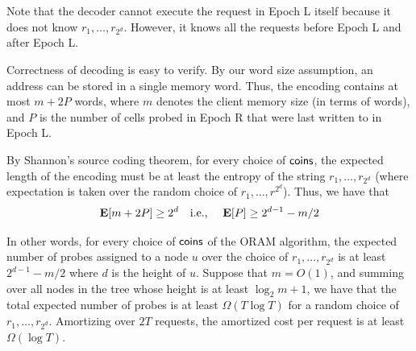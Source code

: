 Note that the decoder cannot execute the request in Epoch L
itself because it does not know $r_1, \ldots, r_{2^d}$.
However, it knows all the requests before Epoch L and after Epoch L. 


Correctness of decoding is easy to verify. 
By our word size
 assumption, an address can be stored in a single memory word.
Thus, the encoding contains at most  
$m + 2 P$
words, where 
$m$
denotes the client memory size (in terms of words), and 
$P$ is the number 
of cells probed in Epoch R that were 
last written to in Epoch L.

By Shannon's source coding theorem, for every choice
of ${\sf coins}$, the expected length of the encoding 
must be at least the entropy
of the string $r_1, \ldots, r_{2^d}$ (where expectation
is taken over the random choice of $r_1, \ldots, r^{2^d}$). 
Thus, we have that 
\[
{\bf E}[m + 2 P] \geq 2^d \quad \text{i.e., }
\quad {\bf E}[P] \geq 2^{d-1}-m/2
\]

In other words, 
for every choice of ${\sf coins}$ of the ORAM algorithm, 
the expected number of probes assigned to a node $u$  
over the choice of $r_1, \ldots, r_{2^d}$
is at least $2^{d-1}-m/2$ where $d$ is the height of $u$. 
Suppose that $m = O(1)$, and summing over all nodes
in the tree whose height 
is at least $\log_2 m + 1$, 
we have that the total expected number of probes
is at least $\Omega(T \log T)$
for a random choice of $r_1, \ldots, r_{2^d}$.
Amortizing over $2T$ requests, the amortized cost
per request is at least $\Omega(\log T)$. 


